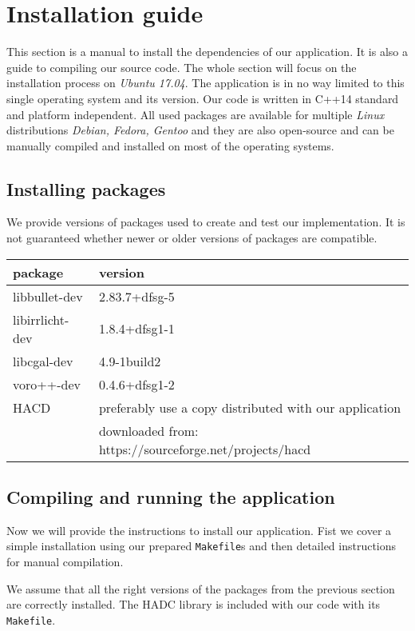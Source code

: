\chapter{Installation guide}

This section is a manual to install the dependencies of our application. It is also a guide to compiling our source code. The whole section will focus on the installation process on \emph{Ubuntu 17.04}. The application is in no way limited to this single operating system and its version. Our code is written in \emph{}{C++14} standard and platform independent. All used packages are available for multiple \emph{Linux} distributions \eg \emph{Debian, Fedora, Gentoo }  and they are also open-source and can be manually compiled and installed on most of the operating systems.

\section{Installing packages}
We provide versions of packages used to create and test our implementation. It is not guaranteed whether newer or older versions of packages are compatible.
\begin{center}
\begin{tabular}{ |l|l| }
\hline
package & version \\
\hline
libbullet-dev & 2.83.7+dfsg-5 \\
libirrlicht-dev & 1.8.4+dfsg1-1 \\
libcgal-dev & 4.9-1build2 \\
voro++-dev & 0.4.6+dfsg1-2 \\
HACD & preferably use a copy distributed with our application\\
&downloaded from: https://sourceforge.net/projects/hacd\\
\hline
\end{tabular}
\end{center}

\section{Compiling and running the application}
Now we will provide the instructions to install our application. Fist we cover a simple installation using our prepared {\tt Makefile}s and then detailed instructions for manual compilation.

We assume that all the right versions of the packages from the previous section are correctly installed. The HADC library is included with our code with its {\tt Makefile}.

